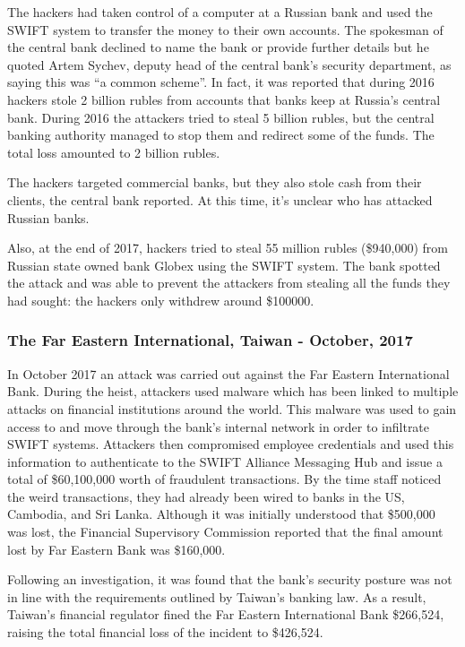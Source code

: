 \documentclass[12pt]{article}
\begin{document}
        The hackers had taken control of a computer at a Russian bank and used the SWIFT system to transfer the money to their own accounts. 
        The spokesman of the central bank declined to name the bank or provide further details but he quoted Artem Sychev, deputy head of the central bank’s security department, as saying this was “a common scheme”. In fact, it was reported that during 2016 hackers stole 2 billion rubles from accounts that banks keep at Russia's central bank. During 2016 the attackers tried to steal 5 billion rubles, but the central banking authority managed to stop them and redirect some of the funds. The total loss amounted to 2 billion rubles.
        
        The hackers targeted commercial banks, but they also stole cash from their clients, the central bank reported. At this time, it's unclear who has attacked Russian banks.
        
        Also, at the end of 2017, hackers tried to steal 55 million rubles (\$940,000) from Russian state owned bank Globex using the SWIFT system. The bank spotted the attack and was able to prevent the attackers from stealing all the funds they had sought: the hackers only withdrew around \$100000.\cite{HackersStoleMillion2018}\cite{UnknownHackersStole2018}\cite{RussiaGlobexBank2017}
        
    \subsubsection{The Far Eastern International, Taiwan - October, 2017}
        In October 2017 an attack was carried out against the Far Eastern International Bank. During the heist, attackers used malware which has been linked to multiple attacks on financial institutions around the world. This malware was used to gain access to and move through the bank’s internal network in order to infiltrate SWIFT systems. Attackers then compromised employee credentials and used this information to authenticate to the SWIFT Alliance Messaging Hub and issue a total of \$60,100,000 worth of fraudulent transactions. By the time staff noticed the weird transactions, they had already been wired to banks in the US, Cambodia, and Sri Lanka. Although it was initially understood that \$500,000 was lost, the Financial Supervisory Commission reported that the final amount lost by Far Eastern Bank was \$160,000.\cite{thomsonHackersNick60m2017}
        
        Following an investigation, it was found that the bank’s security posture was not in line with the requirements outlined by Taiwan’s banking law. As a result, Taiwan’s financial regulator fined the Far Eastern International Bank \$266,524, raising the total financial loss of the incident to \$426,524.\cite{TaiwanFarEastern2017}
        
\end{document}
